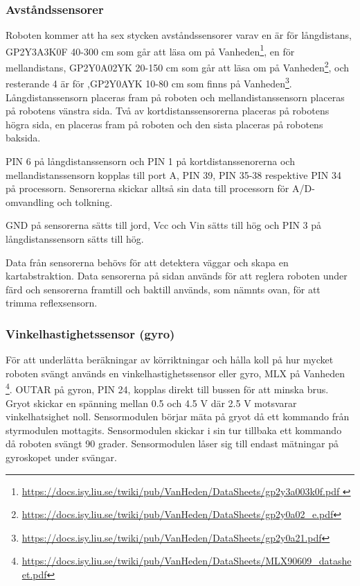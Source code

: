 \documentclass[a4paper,12pt,fleqn]{article}
\begin{document}
\subsubsection{Avståndssensorer}
Roboten kommer att ha sex stycken av\-stånds\-sensorer varav en är för lång\-distans, GP\-2Y3A\-3K\-0F 40-300 cm som går att läsa om på Vanheden\footnote{\url{ https://docs.isy.liu.se/twiki/pub/VanHeden/DataSheets/gp2y3a003k0f.pdf }}, en för mellan\-distans, GP2Y0A02YK 20-150 cm som går att läsa om på Vanheden\footnote{\url{https://docs.isy.liu.se/twiki/pub/VanHeden/DataSheets/gp2y0a02_e.pdf}}, och resterande 4 är för ,GP\-2Y\-0A\-YK 10-80 cm som finns på Vanheden\footnote{\url{https://docs.isy.liu.se/twiki/pub/VanHeden/DataSheets/gp2y0a21.pdf}}. Långdistanssensorn placeras fram på roboten och mellandistanssensorn placeras på robotens vänstra sida. Två av kortdistanssensorerna placeras på robotens högra sida, en placeras fram på roboten och den sista placeras på robotens baksida.

PIN 6 på långdistanssensorn och PIN 1 på kortdistanssenorerna och mellandistanssensorn kopplas till port A, PIN 39, PIN 35-38 respektive PIN 34 på processorn. Sensorerna skickar alltså sin data till processorn för A/D-omvandling och tolkning.

GND på sensorerna sätts till jord, Vcc och Vin sätts till hög och PIN 3 på långdistanssensorn sätts till hög.
 
Data från sensorerna behövs för att detektera väggar och skapa en kartabstraktion. Data sensorerna på sidan används för att reglera roboten under färd och sensorerna framtill och baktill används, som nämnts ovan, för att trimma reflexsensorn.

\subsubsection{Vinkelhastighetssensor (gyro)}
För att underlätta beräkningar av körriktningar och hålla koll på hur mycket roboten svängt används en vinkelhastighetssensor eller gyro, MLX på Vanheden \footnote{\url{https://docs.isy.liu.se/twiki/pub/VanHeden/DataSheets/MLX90609\_datasheet.pdf}}. OUTAR på gyron, PIN 24, kopplas direkt till bussen för att minska brus. Gryot skickar en spänning mellan 0.5 och 4.5 V där 2.5 V motsvarar vinkelhatsighet noll. Sensormodulen börjar mäta på gryot då ett kommando från styrmodulen mottagits. Sensormodulen skickar i sin tur tillbaka ett kommando då roboten svängt 90 grader. Sensormodulen låser sig till endast mätningar på gyroskopet under svängar.
\end{document}
